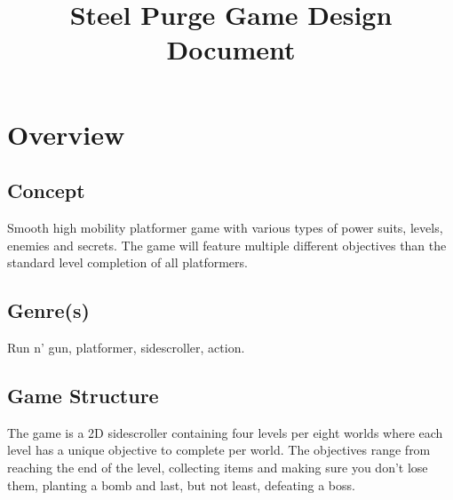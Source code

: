 \documentclass[12pt]{article}
\title{Steel Purge Game Design Document}
\begin{document}
\maketitle{}

\section{Overview}


\subsection{Concept}

Smooth high mobility platformer game with various types of power suits, levels, enemies and secrets. The game will feature multiple different objectives than the standard level completion of all platformers. 

\subsection{Genre(s)}

Run n' gun, platformer, sidescroller, action.

\subsection{Game Structure}

The game is a 2D sidescroller containing four levels per eight worlds where each level has a unique objective to complete per world. The objectives range from reaching the end of the level, collecting items and making sure you don't lose them, planting a bomb and last, but not least, defeating a boss.

\end{document}
